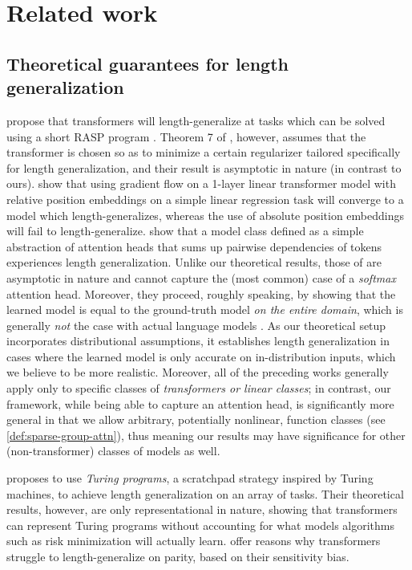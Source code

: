 \section{Related work}
\label{sec:related-work}

\subsection{Theoretical guarantees for length generalization}
\citet{zhou_what_2023,huang_formal_2024}
propose that transformers will length-generalize at tasks which can be solved using a short RASP program \cite{weiss_thinking_2021}. Theorem 7 of \citet{huang_formal_2024}, however, assumes that the transformer is chosen so as to minimize a certain regularizer tailored specifically for length generalization, and their result is asymptotic in nature (in contrast to ours).
\citet{sabbaghi_explicitly_2024} show that using  gradient flow on a 1-layer linear transformer model with relative position embeddings on a simple linear regression task will converge to a model which length-generalizes, whereas the use of absolute position embeddings will fail to length-generalize. \citet{ahuja_provable_2024} show that a model class defined as a simple abstraction of attention heads that sums up pairwise dependencies of tokens experiences length generalization. %
Unlike our theoretical results, those of   \citet{sabbaghi_explicitly_2024,ahuja_provable_2024} are asymptotic in nature and cannot capture the (most common) case of a \emph{softmax} attention head. Moreover, they proceed, roughly speaking, by showing that the learned model is equal to the ground-truth model \emph{on the entire domain}, which is generally \emph{not} the case with actual language models \cite{zou_universal_2023,wei_jailbroken_2023,andriushchenko_jailbreaking_2024}. As our theoretical setup incorporates distributional assumptions, it establishes length generalization in cases where the learned model is only accurate on in-distribution inputs, which we believe to be more realistic.
Moreover, all of the preceding works generally apply only to specific classes of \emph{transformers or linear classes}; in contrast, our framework, while being able to capture an attention head, is significantly more general in that we allow arbitrary, potentially nonlinear, function classes (see \cref{def:sparse-group-attn}), thus meaning our results may have significance for other (non-transformer) classes of models as well. 

\citet{hou_universal_2024} proposes to use \emph{Turing programs}, a scratchpad strategy inspired by Turing machines, to achieve length generalization on an array of tasks. Their  theoretical results, however, are only representational in nature, showing that transformers can represent Turing programs without  accounting for what models algorithms such as risk minimization will actually learn. \citet{hahn_why_2024} offer reasons why transformers struggle to length-generalize on parity, based on their sensitivity bias. 

